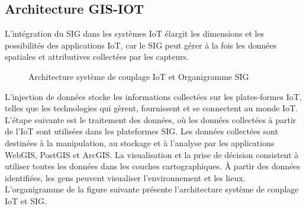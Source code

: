 \documentclass{report}
\begin{document}
\subsection{Architecture GIS-IOT}
L'intégration du SIG dans les systèmes IoT élargit les dimensions et les possibilités des applications IoT, car le SIG peut gérer à la fois les données spatiales et attributives collectées par les capteurs. \\
  \begin{figure}[h]
        \centering
        \caption{ Architecture système de couplage IoT et Organigramme SIG \cite{[Çetin Önder İncekara et al.,Internet of Things (IoT) in GIS, 5 mars 2023}}
        \label{b}
    \end{figure}

L'injection de données stocke les informations collectées sur les plates-formes IoT, telles que les technologies qui gèrent, fournissent et se connectent au monde IoT. L'étape suivante est le traitement des données, où les données collectées à partir de l'IoT sont utilisées dans les plateformes SIG. Les données collectées sont destinées à la manipulation, au stockage et à l'analyse par les applications WebGIS, PostGIS et ArcGIS. La visualisation et la prise de décision consistent à utiliser toutes les données dans les couches cartographiques. À partir des données identifiées, les gens peuvent visualiser l'environnement et les lieux. \\

L'organigramme de la figure suivante présente l'architecture système de couplage IoT et SIG. \\
\end{document}
